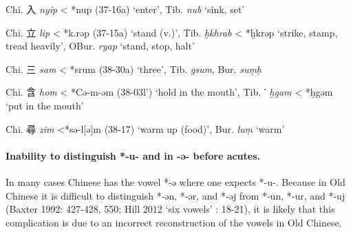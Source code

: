\begin{description} \item
Chi. 入 \emph{nyip} \textless{} *nup (37-16a) `enter', Tib. {} \emph{nub} `sink, set'

\item
Chi. 立 \emph{lip} \textless{} *k.rəp (37-15a) `stand (v.)', Tib. {} \emph{ḫkhrab} \textless{} *ḫkrəp `strike, stamp, tread heavily', OBur. {} \emph{ryap} `stand, stop, halt'

\item
Chi. 三 \emph{sam} \textless{} *srum (38-30a) `three', Tib. {} \emph{gsum}, Bur. {} \emph{suṃḥ}

\item
Chi. 含 \emph{hom} \textless{} *Cə-m-{}əm (38-03l') `hold in the mouth',
Tib. {}་ \emph{ḫgam} \textless{} *ḫgəm `put in the mouth'

\item
Chi. 尋 \emph{zim} \textless{}*sə-l{[}ə]m (38-17) `warm up (food)',
Bur. {} \emph{luṃ} `warm'
\end{description}

\paragraph{Inability to distinguish *-u- and
in -ə- before acutes.} In many cases Chinese
has the vowel *-ə where one expects *-u-. Because in Old
Chinese it is difficult to distinguish *‑ən, *‑ər, and *‑əj
from *‑un, *‑ur, and *‑uj (Baxter 1992: 427-428, 550; Hill 2012 `six
vowels' : 18-21), it is likely that this complication is due to an
incorrect reconstruction of the vowels in Old Chinese. 

